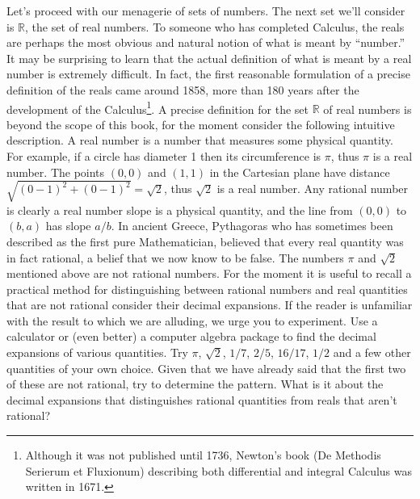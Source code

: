 \documentclass[10pt,]{book}
\theoremstyle{plain}
\theoremstyle{definition}
\theoremstyle{definition}
\numberwithin{equation}{section}
\newcommand{\Reals}{{\mathbb R}}
\begin{document}
    Let's proceed with our menagerie of sets of numbers. The next set
    we'll consider is \(\Reals\), the set of real numbers. To someone
    who has completed Calculus, the reals are perhaps the most obvious and
    natural notion of what is meant by ``number.'' It may be surprising to
    learn that the actual definition of what is meant by a real number is
    extremely difficult. In fact, the first reasonable formulation of a
    precise definition of the reals came around 1858, more than 180 years
    after the development of the
    Calculus\footnote{Although it was not
      published until 1736, Newton's book (De Methodis Serierum et
      Fluxionum) describing both differential and integral Calculus was
      written in 1671.\label{fn-3}}. A precise
    definition for the set \(\Reals\) of real numbers is
    beyond the scope of this book, for the moment consider the
    following intuitive description. A real number is a number that
    measures some physical quantity. For example, if a circle has
    diameter 1 then its circumference is \(\pi\), thus \(\pi\) is a real
    number. The points \((0,0)\) and \((1,1)\) in the Cartesian plane have
    distance \(\sqrt{ (0-1)^2 + (0-1)^2} = \sqrt{2}\), thus \(\sqrt{2}\) is
    a real number. Any rational number is clearly a real number \textemdash{} slope
    is a physical quantity, and the line from \((0,0)\) to \((b,a)\) has slope
    \(a/b\). In ancient Greece, Pythagoras \textemdash{} who has sometimes been
    described as the first pure Mathematician, believed that
    every real quantity was in fact rational, a belief that we now know to
    be false. The numbers \(\pi\) and \(\sqrt{2}\) mentioned above are not
    rational numbers. For the moment it is useful to recall a practical
    method for distinguishing between rational numbers and real quantities
    that are not rational \textemdash{} consider their decimal expansions. If the
    reader is unfamiliar with the result to which we are alluding, we urge
    you to experiment. Use a calculator or (even better) a computer
    algebra package to find the decimal expansions of various quantities.
    Try \(\pi\), \(\sqrt{2}\), \(1/7\), \(2/5\), \(16/17\), \(1/2\) and a few other
    quantities of your own choice. Given that we have already said that the first
    two of these are not rational, try to determine the pattern. What is
    it about the decimal expansions
    that distinguishes rational quantities from reals that aren't rational?
\par
\end{document}
